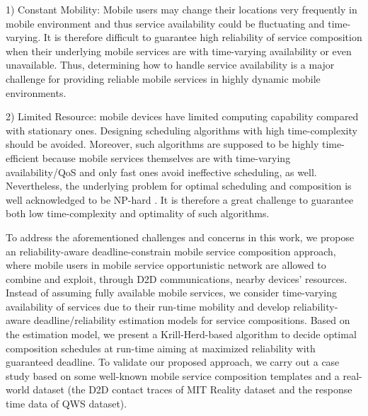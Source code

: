 \documentclass[journal]{IEEEtran}
\begin{document}
1) Constant Mobility: Mobile users may change their locations very frequently in mobile environment and thus service availability could be fluctuating and time-varying. It is therefore difficult to guarantee high reliability of service composition when their underlying mobile services are with time-varying availability or even unavailable. Thus, determining how to handle service availability is a major challenge for providing reliable mobile services in highly dynamic mobile environments.

2) Limited Resource: mobile devices have limited computing capability compared with stationary ones. Designing scheduling algorithms with high time-complexity should be avoided.
Moreover, such algorithms are supposed to be highly time-efficient because mobile services themselves are with time-varying availability/QoS and only fast ones avoid ineffective scheduling, as well. 
Nevertheless, the underlying problem for optimal scheduling and composition is well acknowledged to be NP-hard . It is therefore a great challenge to guarantee both low time-complexity and optimality of such algorithms.

To address the aforementioned challenges and concerns in this work, we propose an reliability-aware deadline-constrain mobile service composition approach, where mobile users in mobile service opportunistic network are allowed to combine and exploit, through D2D communications, nearby devices' resources. Instead of assuming fully available mobile services, we consider time-varying availability of services due to their run-time mobility and develop reliability-aware deadline/reliability estimation models for service compositions. Based on the estimation model, we present a Krill-Herd-based algorithm to decide optimal composition schedules at run-time aiming at maximized reliability with guaranteed deadline. To validate our proposed approach, we carry out a case study based on some well-known mobile service composition templates and a real-world dataset (the D2D contact traces of MIT Reality dataset and the response time data of QWS dataset).


\end{document}
